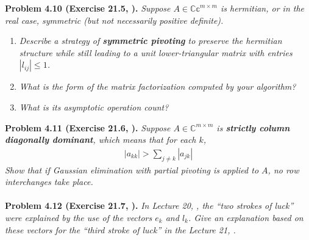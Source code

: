 \documentclass[a4paper,oneside]{book}
\numberwithin{equation}{chapter}
\begin{document}
\textbf{Problem 4.10 (Exercise 21.5, \cite{1}).} \textit{Suppose $A\in \mathbb{Cc}^{m\times m}$ is hermitian, or in the real case, symmetric (but not necessarily positive definite).}
\begin{enumerate}
\item \textit{Describe a strategy of \textbf{symmetric pivoting} to preserve the hermitian structure while still leading to a unit lower-triangular matrix with entries $\left|l_{ij}\right| \le 1$.}
\item \textit{What is the form of the matrix factorization computed by your algorithm?}
\item \textit{What is its asymptotic operation count?}
\end{enumerate}
\textbf{Problem 4.11 (Exercise 21.6, \cite{1}).} \textit{Suppose $A\in \mathbb{C}^{m\times m}$ is \textbf{strictly column diagonally dominant}, which means that for each $k$,}
\begin{align}
\left| {{a_{kk}}} \right| > \sum\limits_{j \ne k} {\left| {{a_{jk}}} \right|} 
\end{align}
\textit{Show that if Gaussian elimination with partial pivoting is applied to $A$, no row interchanges take place.}\\
\\
\textbf{Problem 4.12 (Exercise 21.7, \cite{1}).} \textit{In Lecture 20, \cite{1}, the ``two strokes of luck'' were explained by the use of the vectors $e_k$ and $l_k$. Give an explanation based on these vectors for the ``third stroke of luck'' in the Lecture 21, \cite{1}.}
\end{document}
